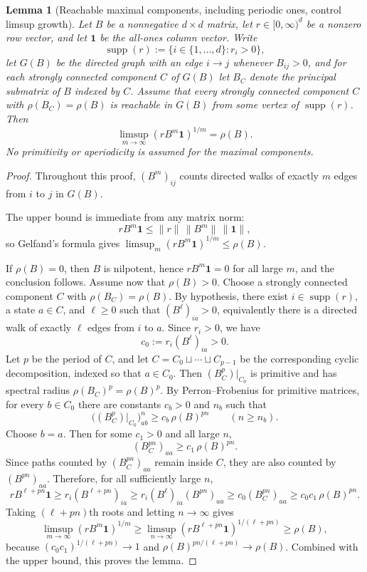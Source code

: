 \documentclass{etds}%
\numberwithin{equation}{section}
\theoremstyle{plain}
\newtheorem{lemma}[theorem]{Lemma}
\theoremstyle{definition}
\theoremstyle{remark}
\begin{document}
\begin{lemma}[Reachable maximal components, including periodic ones, control limsup growth]
\label{lem:reachable-maximal-components}
Let $B$ be a nonnegative $d\times d$ matrix, let $r\in[0,\infty)^d$ be a
nonzero row vector, and let $\mathbf{1}$ be the all-ones column vector.  Write
\[
\operatorname{supp}(r):=\{i\in\{1,\dots,d\}:r_i>0\},
\]
let $G(B)$ be the directed graph with an edge $i\to j$ whenever $B_{ij}>0$,
and for each strongly connected component $C$ of $G(B)$ let $B_C$ denote the
principal submatrix of $B$ indexed by $C$.  Assume that every strongly
connected component $C$ with $\rho(B_C)=\rho(B)$ is reachable in $G(B)$ from
some vertex of $\operatorname{supp}(r)$.  Then
\[
\limsup_{m\to\infty}(rB^m\mathbf{1})^{1/m}=\rho(B).
\]
No primitivity or aperiodicity is assumed for the maximal components.
\end{lemma}

\begin{proof}
Throughout this proof, $(B^m)_{ij}$ counts directed walks of exactly $m$
edges from $i$ to $j$ in $G(B)$.

The upper bound is immediate from any matrix norm:
\[
rB^m\mathbf{1}\le \|r\|\,\|B^m\|\,\|\mathbf{1}\|,
\]
so Gelfand's formula gives
$\limsup_m(rB^m\mathbf{1})^{1/m}\le \rho(B)$.

If $\rho(B)=0$, then $B$ is nilpotent, hence $rB^m\mathbf{1}=0$ for all large
$m$, and the conclusion follows.  Assume now that $\rho(B)>0$.  Choose a
strongly connected component $C$ with $\rho(B_C)=\rho(B)$.  By hypothesis,
there exist $i\in\operatorname{supp}(r)$, a state $a\in C$, and $\ell\ge 0$
such that $(B^\ell)_{ia}>0$, equivalently there is a directed walk of exactly
$\ell$ edges from $i$ to $a$.  Since $r_i>0$, we have
\[
c_0:=r_i(B^\ell)_{ia}>0.
\]
Let $p$ be the period of $C$, and let
$C=C_0\sqcup\cdots\sqcup C_{p-1}$ be the corresponding cyclic decomposition,
indexed so that $a\in C_0$.  Then $(B_C^p)|_{C_0}$ is primitive and has
spectral radius $\rho(B_C)^p=\rho(B)^p$.  By Perron--Frobenius for primitive
matrices, for every $b\in C_0$ there are constants $c_b>0$ and $n_b$ such
that
\[
\bigl((B_C^p)|_{C_0}\bigr)^n_{ab}\ge c_b\,\rho(B)^{pn}
\qquad(n\ge n_b).
\]
Choose $b=a$.  Then for some $c_1>0$ and all large $n$,
\[
(B_C^{pn})_{aa}\ge c_1\,\rho(B)^{pn}.
\]
Since paths counted by $(B_C^{pn})_{aa}$ remain inside $C$, they are also
counted by $(B^{pn})_{aa}$.  Therefore, for all sufficiently large $n$,
\[
rB^{\ell+pn}\mathbf{1}
\ge r_i(B^{\ell+pn})_{ia}
\ge r_i(B^\ell)_{ia}(B^{pn})_{aa}
\ge c_0(B_C^{pn})_{aa}
\ge c_0c_1\,\rho(B)^{pn}.
\]
Taking $(\ell+pn)$th roots and letting $n\to\infty$ gives
\[
\limsup_{m\to\infty}(rB^m\mathbf{1})^{1/m}
\ge
\limsup_{n\to\infty}(rB^{\ell+pn}\mathbf{1})^{1/(\ell+pn)}
\ge \rho(B),
\]
because $(c_0c_1)^{1/(\ell+pn)}\to 1$ and
$\rho(B)^{pn/(\ell+pn)}\to \rho(B)$.  Combined with the upper bound, this
proves the lemma.
\end{proof}
\end{document}
